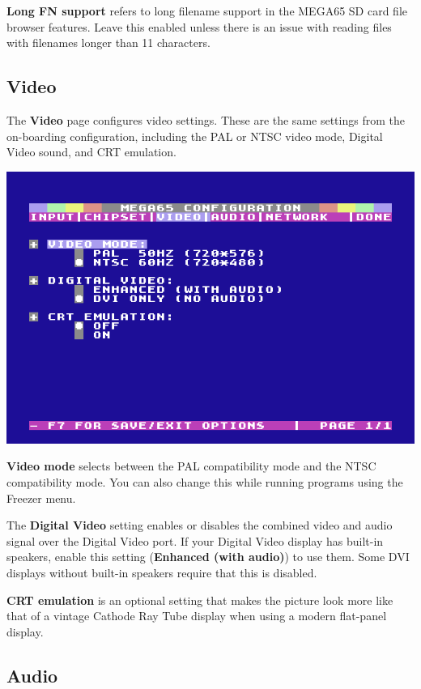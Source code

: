 {\bf Long FN support} refers to long filename support in the MEGA65 SD card file browser features. Leave this enabled unless there is an issue with reading files with filenames longer than 11 characters.

\subsection{Video}

The {\bf Video} page configures video settings. These are the same settings from the on-boarding configuration, including the PAL or NTSC video mode, Digital Video sound, and CRT emulation.

\begin{center}
  \includegraphics[width=0.7\linewidth]{images/ss-m65config-3.png}
\end{center}

{\bf Video mode} selects between the PAL compatibility mode and the NTSC compatibility mode. You can also change this while running programs using the Freezer menu.

The {\bf Digital Video} setting enables or disables the combined video and audio signal over the Digital Video port. If your Digital Video display has built-in speakers, enable this setting ({\bf Enhanced (with audio)}) to use them. Some DVI displays without built-in speakers require that this is disabled.

{\bf CRT emulation} is an optional setting that makes the picture look more like that of a vintage Cathode Ray Tube display when using a modern flat-panel display.

\subsection{Audio}


